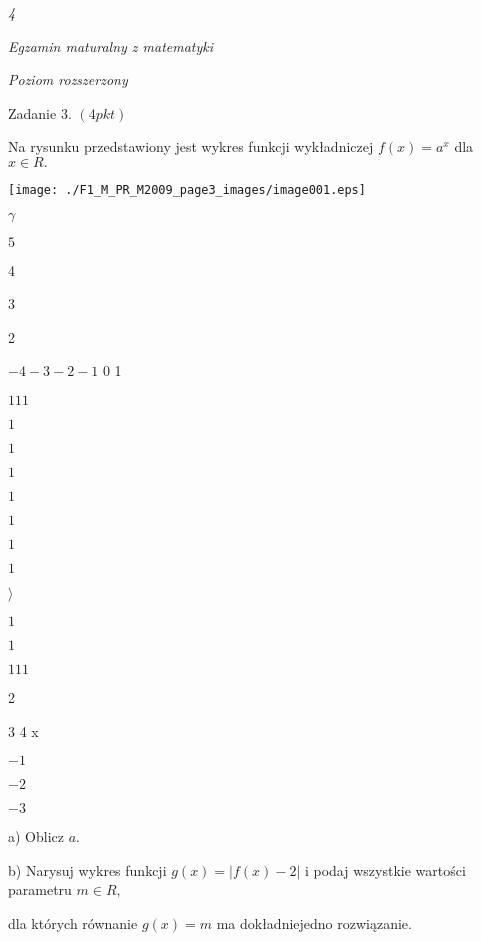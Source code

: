 \documentclass[a4paper,12pt]{article}
\begin{document}
{\it 4}

{\it Egzamin maturalny z matematyki}

{\it Poziom rozszerzony}

Zadanie 3. $(4pkt)$

Na rysunku przedstawiony jest wykres funkcji wykładniczej $f(x)=a^{x}$ dla $x\in R.$
\begin{center}
\texttt{[image: ./F1\_M\_PR\_M2009\_page3\_images/image001.eps]}
\end{center}
$\gamma$

$5$

4

3

2

$-4 -3  -2 -1$  0 1

$111$

$1$

$1$

$1$

$1$

$1$

$1$

$1$

$\rangle$

$1$

$1$

$111$

2

3 4 x

$-1$

$-2$

$-3$

a) Oblicz $a.$

b) Narysuj wykres funkcji $g(x)=|f(x)-2|$ i podaj wszystkie wartości parametru $m\in R,$

dla których równanie $g(x)=m$ ma dokładniejedno rozwiązanie.
\end{document}
